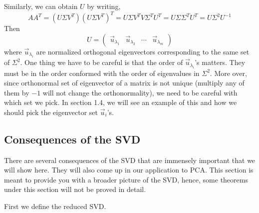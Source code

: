 \documentclass{article}
\begin{document}
Similarly, we can obtain $U$ by writing,
$$AA^T = (U \Sigma V^T)(U \Sigma V^T)^T = U \Sigma V^T V \Sigma^TU^T = U \Sigma  \Sigma^TU^T = U  \Sigma^2U^{-1}$$
Then 
$$U = \begin{pmatrix} \vec{u}_{\lambda_1} & \vec{u}_{\lambda_2} & \cdots & \vec{u}_{\lambda_m} \end{pmatrix}$$ 
where $\vec{u}_{\lambda_i}$ are normalized orthogonal eigenvectors corresponding to the same set of $\Sigma^2$. One thing we have to be careful is that the order of $\vec{u}_{\lambda_i}$'s matters. They must be in the order conformed with the order of eigenvalues in $\Sigma^2$. More over, since orthonormal set of eigenvector of a matrix is not unique (multiply any of them by $-1$ will not change the orthonormality), we need to be careful with which set we pick. In section 1.4, we will see an example of this and how we should pick the eigenvector set $\vec{u}_i$'s.

\subsection{Consequences of the SVD}
There are several consequences of the SVD that are immensely important that we will show here. They will also come up in our application to PCA. This section is meant to provide you with a broader picture of the SVD, hence, some theorems under this section will not be proved in detail. 

First we define the reduced SVD.
\end{document}
